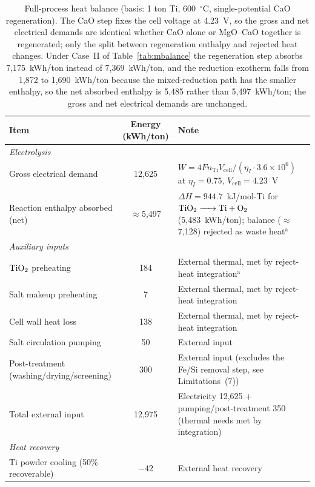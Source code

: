 \documentclass[pdflatex,sn-basic,Numbered]{sn-jnl}
\begin{document}
\begin{table}[!ht]
\centering
\footnotesize
\caption{Full-process heat balance (basis: 1 ton Ti, 600~$^{\circ}$C, single-potential CaO regeneration). The CaO step fixes the cell voltage at 4.23~V, so the gross and net electrical demands are identical whether CaO alone or MgO--CaO together is regenerated; only the split between regeneration enthalpy and rejected heat changes. Under Case~II of Table~\ref{tab:mbalance} the regeneration step absorbs 7{,}175~kWh/ton instead of 7{,}369~kWh/ton, and the reduction exotherm falls from 1{,}872 to 1{,}690~kWh/ton because the mixed-reduction path has the smaller enthalpy, so the net absorbed enthalpy is 5{,}485 rather than 5{,}497~kWh/ton; the gross and net electrical demands are unchanged.}
\label{tab:heatbal}
\begin{tabularx}{\linewidth}{l c X}
\toprule
Item & Energy (kWh/ton) & Note \\
\midrule
\multicolumn{3}{l}{\textit{Electrolysis}} \\
\quad Gross electrical demand & 12{,}625 & $W = 4F n_{\mathrm{Ti}} V_{\mathrm{cell}}/(\eta_I \cdot 3.6{\times}10^6)$ at $\eta_I=0.75$, $V_{\mathrm{cell}}=4.23$~V \\
\quad Reaction enthalpy absorbed (net) & $\approx$5{,}497 & $\Delta H = 944.7$~kJ/mol-Ti for $\ce{TiO2 -> Ti + O2}$ (5{,}483~kWh/ton); balance ($\approx$7{,}128) rejected as waste heat$^{\mathrm{a}}$ \\
\midrule
\multicolumn{3}{l}{\textit{Auxiliary inputs}} \\
\quad $\ce{TiO2}$ preheating & 184 & External thermal, met by reject-heat integration$^{\mathrm{a}}$ \\
\quad Salt makeup preheating & 7 & External thermal, met by reject-heat integration \\
\quad Cell wall heat loss & 138 & External thermal, met by reject-heat integration \\
\quad Salt circulation pumping & 50 & External input \\
\quad Post-treatment (washing/drying/screening) & 300 & External input (excludes the Fe/Si removal step, see Limitations~(7)) \\
\midrule
\quad Total external input & 12{,}975 & Electricity 12{,}625 + pumping/post-treatment 350 (thermal needs met by integration) \\
\midrule
\multicolumn{3}{l}{\textit{Heat recovery}} \\
\quad Ti powder cooling (50\% recoverable) & $-$42 & External heat recovery \\

\end{tabularx}
\end{table}
\end{document}
